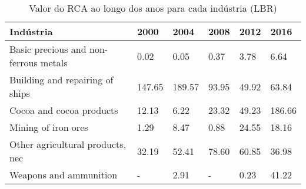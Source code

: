 \begin{table}
\centering
\caption{Valor do RCA ao longo dos anos para cada indústria (LBR)}
\label{tab:ex3-tempo-LBR}
\begin{tabular}{p{6cm}p{1.5cm}p{1.5cm}p{1.5cm}p{1.5cm}p{1.5cm}}
\toprule
                            Indústria &   2000 &   2004 &  2008 &  2012 &   2016 \\
\midrule
Basic precious and non-ferrous metals &   0.02 &   0.05 &  0.37 &  3.78 &   6.64 \\
      Building and repairing of ships & 147.65 & 189.57 & 93.95 & 49.92 &  63.84 \\
             Cocoa and cocoa products &  12.13 &   6.22 & 23.32 & 49.23 & 186.66 \\
                  Mining of iron ores &   1.29 &   8.47 &  0.88 & 24.55 &  18.16 \\
     Other agricultural products, nec &  32.19 &  52.41 & 78.60 & 60.85 &  36.98 \\
               Weapons and ammunition &      - &   2.91 &     - &  0.23 &  41.22 \\
\bottomrule
\end{tabular}
\end{table}
